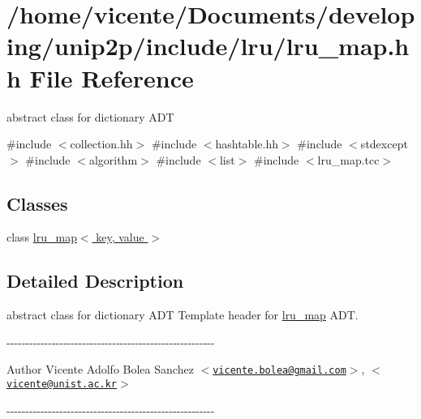 \hypertarget{lru__map_8hh}{\section{/home/vicente/\-Documents/developing/unip2p/include/lru/lru\-\_\-map.hh \-File \-Reference}
\label{lru__map_8hh}
}


abstract class for dictionary \-A\-D\-T  


{\ttfamily \#include $<$collection.\-hh$>$}\*
{\ttfamily \#include $<$hashtable.\-hh$>$}\*
{\ttfamily \#include $<$stdexcept$>$}\*
{\ttfamily \#include $<$algorithm$>$}\*
{\ttfamily \#include $<$list$>$}\*
{\ttfamily \#include $<$lru\-\_\-map.\-tcc$>$}\*
\subsection*{\-Classes}
\begin{DoxyCompactItemize}
\item 
class \hyperlink{classlru__map}{lru\-\_\-map$<$ key, value $>$}
\end{DoxyCompactItemize}


\subsection{\-Detailed \-Description}
abstract class for dictionary \-A\-D\-T \-Template header for \hyperlink{classlru__map}{lru\-\_\-map} \-A\-D\-T.

-\/-\/-\/-\/-\/-\/-\/-\/-\/-\/-\/-\/-\/-\/-\/-\/-\/-\/-\/-\/-\/-\/-\/-\/-\/-\/-\/-\/-\/-\/-\/-\/-\/-\/-\/-\/-\/-\/-\/-\/-\/-\/-\/-\/-\/-\/-\/-\/-\/-\/-\/-\/-\/-\/-\/ \begin{DoxyAuthor}{\-Author}
\-Vicente \-Adolfo \-Bolea \-Sanchez $<$\href{mailto:vicente.bolea@gmail.com}{\tt vicente.\-bolea@gmail.\-com}$>$, $<$\href{mailto:vicente@unist.ac.kr}{\tt vicente@unist.\-ac.\-kr}$>$
\end{DoxyAuthor}
-\/-\/-\/-\/-\/-\/-\/-\/-\/-\/-\/-\/-\/-\/-\/-\/-\/-\/-\/-\/-\/-\/-\/-\/-\/-\/-\/-\/-\/-\/-\/-\/-\/-\/-\/-\/-\/-\/-\/-\/-\/-\/-\/-\/-\/-\/-\/-\/-\/-\/-\/-\/-\/-\/-\/


